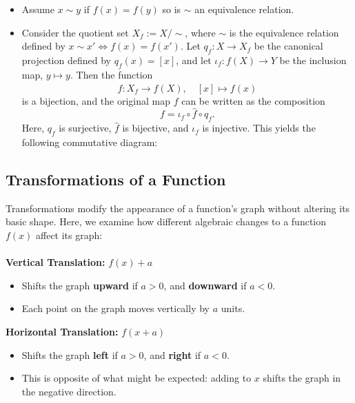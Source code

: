 \begin{itemize}[label =\(-\)]

	\item Assume \(x \sim y \) if \(f(x)= f(y)\) so is \(\sim\) an equivalence relation.

	\item Consider the quotient set \( X_f := X/\sim \), where \( \sim \) is the equivalence relation defined by \( x \sim x' \iff f(x) = f(x') \). Let \( q_f : X \to X_f \) be the canonical projection defined by \( q_f(x) = [x] \), and let \( \iota_f : f(X) \to Y \) be the inclusion map, \( y \mapsto y \). Then the function
	      \[
		      \hat{f} : X_f \to f(X), \quad [x] \mapsto f(x)
	      \]
	      is a bijection, and the original map \( f \) can be written as the composition
	      \[
		      f = \iota_f \circ \hat{f} \circ q_f.
	      \]
	      Here, \( q_f \) is surjective, \( \hat{f} \) is bijective, and \( \iota_f \) is injective. This yields the following commutative diagram:
	      \begin{center}
	      \end{center}

\end{itemize}

\subsection{Transformations of a Function}

Transformations modify the appearance of a function's graph without altering its basic shape.
Here, we examine how different algebraic changes to a function \( f(x) \) affect its graph:
\\\\
	 \textbf{Vertical Translation:} \( f(x) + a \)
	      \begin{itemize}[label=\(-\)]
		      \item Shifts the graph \textbf{upward} if \( a > 0 \), and \textbf{downward} if \( a < 0 \).
		      \item Each point on the graph moves vertically by \( a \) units.
	      \end{itemize}

	\textbf{Horizontal Translation:} \( f(x + a) \)
	      \begin{itemize}[label=\(-\)]
		      \item Shifts the graph \textbf{left} if \( a > 0 \), and \textbf{right} if \( a < 0 \).
		      \item This is opposite of what might be expected: adding to \( x \) shifts the graph in the negative direction.
	      \end{itemize}


